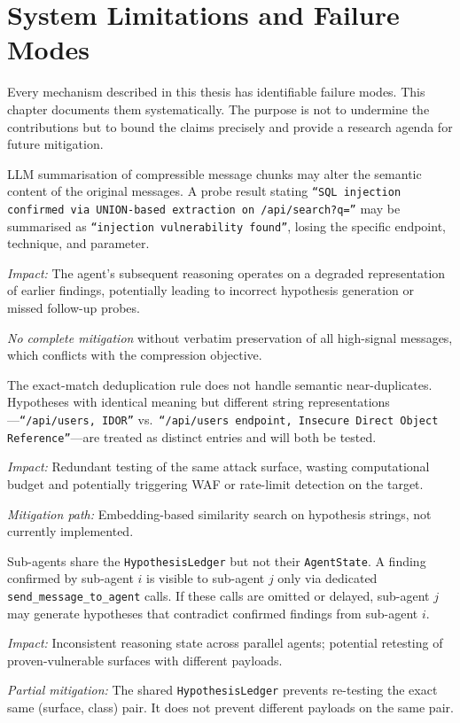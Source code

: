 \documentclass[12pt, a4paper, oneside, openany]{book}
\newcommand{\tool}[1]{\texttt{#1}}
\newcommand{\code}[1]{\texttt{#1}}
\begin{document}
\chapter{System Limitations and Failure Modes}
\label{chap:limits}

Every mechanism described in this thesis has identifiable failure
modes.  This chapter documents them systematically.  The purpose is
not to undermine the contributions but to bound the claims precisely
and provide a research agenda for future mitigation.

\begin{limitbox}
LLM summarisation of compressible message chunks may alter the
semantic content of the original messages.  A probe result stating
\texttt{``SQL injection confirmed via UNION-based extraction on
/api/search?q=''} may be summarised as \texttt{``injection
vulnerability found''}, losing the specific endpoint, technique,
and parameter.

\textit{Impact:} The agent's subsequent reasoning operates on a
degraded representation of earlier findings, potentially leading to
incorrect hypothesis generation or missed follow-up probes.

\textit{No complete mitigation} without verbatim preservation of all
high-signal messages, which conflicts with the compression objective.
\end{limitbox}

\begin{limitbox}
The exact-match deduplication rule does not handle semantic
near-duplicates.  Hypotheses with identical meaning but different
string representations---\texttt{``/api/users, IDOR''} vs.\
\texttt{``/api/users endpoint, Insecure Direct Object Reference''}---are
treated as distinct entries and will both be tested.

\textit{Impact:} Redundant testing of the same attack surface, wasting
computational budget and potentially triggering WAF or rate-limit
detection on the target.

\textit{Mitigation path:} Embedding-based similarity search on
hypothesis strings, not currently implemented.
\end{limitbox}

\begin{limitbox}[Failure Mode F4 -- Agent Reasoning Inconsistency]
Sub-agents share the \code{HypothesisLedger} but not their
\code{AgentState}.  A finding confirmed by sub-agent $i$ is visible
to sub-agent $j$ only via dedicated \tool{send\_message\_to\_agent}
calls.  If these calls are omitted or delayed, sub-agent $j$ may
generate hypotheses that contradict confirmed findings from sub-agent $i$.

\textit{Impact:} Inconsistent reasoning state across parallel agents;
potential retesting of proven-vulnerable surfaces with different payloads.

\textit{Partial mitigation:} The shared \code{HypothesisLedger}
prevents re-testing the exact same (surface, class) pair.  It does
not prevent different payloads on the same pair.
\end{limitbox}
\end{document}
